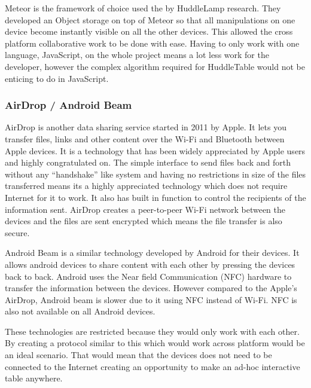Meteor is the framework of choice used the by HuddleLamp research.
They developed an Object storage on top of Meteor so that all manipulations
on one device become instantly visible on all the other devices. This
allowed the cross platform collaborative work to be done with ease.
Having to only work with one language, JavaScript, on the whole project
means a lot less work for the developer, however the complex algorithm
required for HuddleTable would not be enticing to do in JavaScript.
 
 
\subsubsection{AirDrop / Android Beam}
 
AirDrop\cite{airdrop} is another data sharing service started in
2011 by Apple. It lets you transfer files, links and other content
over the Wi-Fi and Bluetooth between Apple devices. It is a technology
that has been widely appreciated by Apple users and highly congratulated
on. The simple interface to send files back and forth without any
``handshake'' like system and having no restrictions in size of
the files transferred means its a highly appreciated technology which
does not require Internet for it to work. It also has built in function
to control the recipients of the information sent. AirDrop creates
a peer-to-peer Wi-Fi network between the devices and the files are
sent encrypted which means the file transfer is also secure.
 
Android Beam\cite{android-beam} is a similar technology developed
by Android for their devices. It allows android devices to share content
with each other by pressing the devices back to back. Android uses
the Near field Communication (NFC) hardware to transfer the information
between the devices. However compared to the Apple's AirDrop, Android
beam is slower due to it using NFC instead of Wi-Fi. NFC is also not
available on all Android devices.
 
These technologies are restricted because they would only work with
each other. By creating a protocol similar to this which would work
across platform would be an ideal scenario. That would mean that the
devices does not need to be connected to the Internet creating an
opportunity to make an ad-hoc interactive table anywhere.
 

